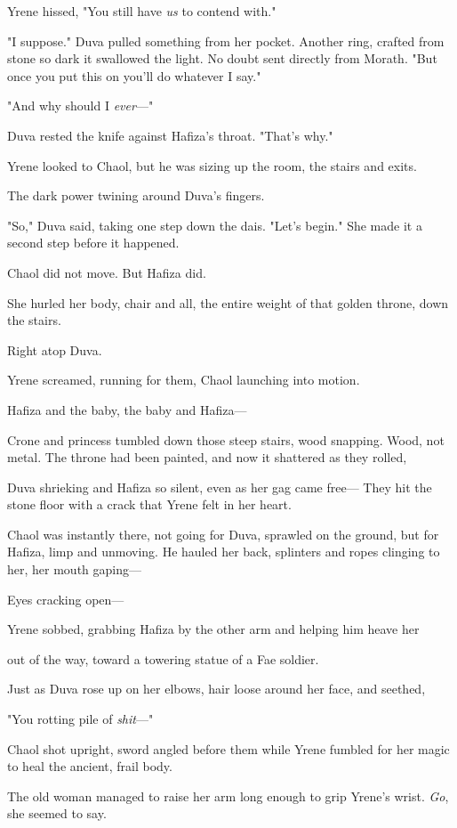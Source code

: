Yrene hissed, "You still have \emph{us} to contend with."

"I suppose." Duva pulled something from her pocket. Another ring, crafted from stone so dark it swallowed the light. No doubt sent directly from Morath. "But once you put this on  you'll do whatever I say."

"And why should I \emph{ever}---"

Duva rested the knife against Hafiza's throat. "That's why."

Yrene looked to Chaol, but he was sizing up the room, the stairs and exits.

The dark power twining around Duva's fingers.

"So," Duva said, taking one step down the dais. "Let's begin." She made it a second step before it happened.

Chaol did not move. But Hafiza did.

She hurled her body, chair and all, the entire weight of that golden throne, down the stairs.

Right atop Duva.

Yrene screamed, running for them, Chaol launching into motion.

Hafiza and the baby, the baby and Hafiza---

Crone and princess tumbled down those steep stairs, wood snapping. Wood, not metal. The throne had been painted, and now it shattered as they rolled,

Duva shrieking and Hafiza so silent, even as her gag came free--- They hit the stone floor with a crack that Yrene felt in her heart.

Chaol was instantly there, not going for Duva, sprawled on the ground, but for Hafiza, limp and unmoving. He hauled her back, splinters and ropes clinging to her, her mouth gaping---

Eyes cracking open---

Yrene sobbed, grabbing Hafiza by the other arm and helping him heave her

out of the way, toward a towering statue of a Fae soldier.

Just as Duva rose up on her elbows, hair loose around her face, and seethed,

"You rotting pile of \emph{shit}---"

Chaol shot upright, sword angled before them while Yrene fumbled for her magic to heal the ancient, frail body.

The old woman managed to raise her arm long enough to grip Yrene's wrist. \emph{Go}, she seemed to say.

